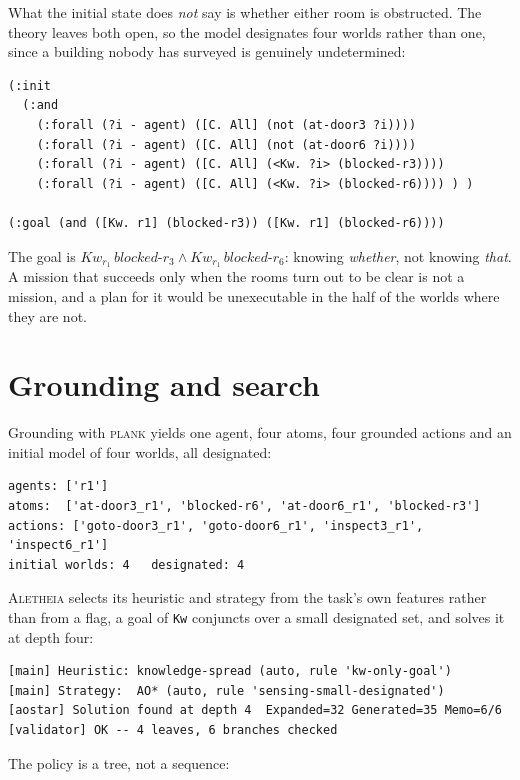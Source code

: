 \documentclass[11pt,a4paper]{article}
\theoremstyle{definition}
\newcommand{\Kw}[1]{\mathit{Kw}_{#1}}
\newcommand{\code}[1]{\texttt{\small #1}}
\begin{document}
What the initial state does \emph{not} say is whether either room is
obstructed. The theory leaves both open, so the model designates four worlds
rather than one, since a building nobody has surveyed is genuinely
undetermined:

\begin{lstlisting}
(:init
  (:and
    (:forall (?i - agent) ([C. All] (not (at-door3 ?i))))
    (:forall (?i - agent) ([C. All] (not (at-door6 ?i))))
    (:forall (?i - agent) ([C. All] (<Kw. ?i> (blocked-r3))))
    (:forall (?i - agent) ([C. All] (<Kw. ?i> (blocked-r6)))) ) )

(:goal (and ([Kw. r1] (blocked-r3)) ([Kw. r1] (blocked-r6))))
\end{lstlisting}

The goal is $\Kw{r_1}\,\mathit{blocked}\text{-}r_3 \wedge
\Kw{r_1}\,\mathit{blocked}\text{-}r_6$: knowing \emph{whether}, not knowing
\emph{that}. A mission that succeeds only when the rooms turn out to be clear is
not a mission, and a plan for it would be unexecutable in the half of the worlds
where they are not.

\section{Grounding and search}

Grounding with \textsc{plank} yields one agent, four atoms, four grounded
actions and an initial model of four worlds, all designated:

\begin{lstlisting}
agents: ['r1']
atoms:  ['at-door3_r1', 'blocked-r6', 'at-door6_r1', 'blocked-r3']
actions: ['goto-door3_r1', 'goto-door6_r1', 'inspect3_r1', 'inspect6_r1']
initial worlds: 4   designated: 4
\end{lstlisting}

\textsc{Aletheia} selects its heuristic and strategy from the task's own
features rather than from a flag, a goal of \code{Kw} conjuncts over a small
designated set, and solves it at depth four:

\begin{lstlisting}
[main] Heuristic: knowledge-spread (auto, rule 'kw-only-goal')
[main] Strategy:  AO* (auto, rule 'sensing-small-designated')
[aostar] Solution found at depth 4  Expanded=32 Generated=35 Memo=6/6
[validator] OK -- 4 leaves, 6 branches checked
\end{lstlisting}

The policy is a tree, not a sequence:
\end{document}
